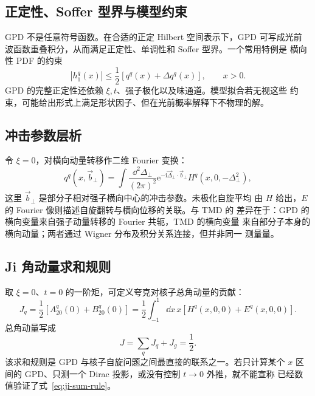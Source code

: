 \documentclass[12pt,a4paper]{ctexart}
\theoremstyle{definition}
\newcommand{\ii}{\mathrm{i}}
\newcommand{\ee}{\mathrm{e}}
\begin{document}
\subsection{正定性、Soffer 型界与模型约束}

GPD 不是任意符号函数。在合适的正定 Hilbert 空间表示下，GPD 可写成光前
波函数重叠积分，从而满足正定性、单调性和 Soffer 型界。一个常用特例是
横向性 PDF 的约束
\begin{equation}
|h_1^q(x)|\leq \frac12\left[q^q(x)+\Delta q^q(x)\right],\qquad x>0 .
\label{eq:soffer-bound}
\end{equation}
GPD 的完整正定性还依赖 $\xi,t$、强子极化以及味通道。模型拟合若无视这些
约束，可能给出形式上满足形状因子、但在光前概率解释下不物理的解。

\subsection{冲击参数层析}

令 $\xi=0$，对横向动量转移作二维 Fourier 变换：
\begin{equation}
q^q(x,\vec b_\perp)
=\int\frac{\dd^2\Delta_\perp}{(2\pi)^2}
\ee^{-\ii\vec\Delta_\perp\cdot\vec b_\perp}
H^q(x,0,-\Delta_\perp^2),
\label{eq:impact-parameter-gpd}
\end{equation}
这里 $\vec b_\perp$ 是部分子相对强子横向中心的冲击参数。未极化自旋平均
由 $H$ 给出，$E$ 的 Fourier 像则描述自旋翻转与横向位移的关联。与 TMD 的
差异在于：GPD 的横向变量来自强子动量转移的 Fourier 共轭，TMD 的横向变量
来自部分子本身的横向动量；两者通过 Wigner 分布及积分关系连接，但并非同一
测量量。

\subsection{Ji 角动量求和规则}

取 $\xi=0$、$t=0$ 的一阶矩，可定义夸克对核子总角动量的贡献：
\begin{equation}
J_q=\frac12\left[A_{20}^q(0)+B_{20}^q(0)\right]
=\frac12\int_{-1}^{1}\dd x\,x
\left[H^q(x,0,0)+E^q(x,0,0)\right].
\label{eq:ji-sum-rule}
\end{equation}
总角动量写成
\begin{equation}
J=\sum_qJ_q+J_g=\frac12 .
\label{eq:total-angular-momentum}
\end{equation}
该求和规则是 GPD 与核子自旋问题之间最直接的联系之一。若只计算某个 $x$
区间的 GPD、只测一个 Dirac 投影，或没有控制 $t\to0$ 外推，就不能宣称
已经数值验证了式~\eqref{eq:ji-sum-rule}。
\end{document}
